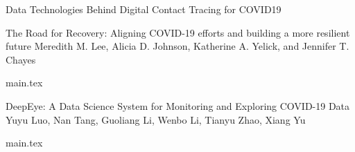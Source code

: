 \documentclass[11pt]{article}
\begin{document}
\begin{bulletin}
\begin{articlesection}{Data Technologies Behind Digital Contact Tracing for COVID19}
\makeatletter
\renewcommand{\AB@affillist}{}
\renewcommand{\AB@authlist}{}
\setcounter{authors}{0}
\makeatother


\begin{article}
{The Road for Recovery: 
Aligning COVID-19 efforts and building a more resilient future}
{Meredith M. Lee, Alicia D. Johnson, Katherine A. Yelick, and Jennifer T. Chayes}
\graphicspath{{submissions/OpEd_June2020_IEEEDataEng/figs/}}
{main.tex}
\end{article}


\makeatletter
\renewcommand{\AB@affillist}{}
\renewcommand{\AB@authlist}{}
\setcounter{authors}{0}
\makeatother



\begin{article}
{DeepEye: A Data Science System for Monitoring and Exploring COVID-19 Data}
{Yuyu Luo, Nan Tang, Guoliang Li, Wenbo Li, Tianyu Zhao, Xiang Yu}
\graphicspath{{submissions/deepeye}}
{main.tex}
\end{article}


\makeatletter
\renewcommand{\AB@affillist}{}
\renewcommand{\AB@authlist}{}
\setcounter{authors}{0}
\makeatother


\end{articlesection}




%
%





\begin{callsection}


\end{callsection}
\end{bulletin}
\end{document}
